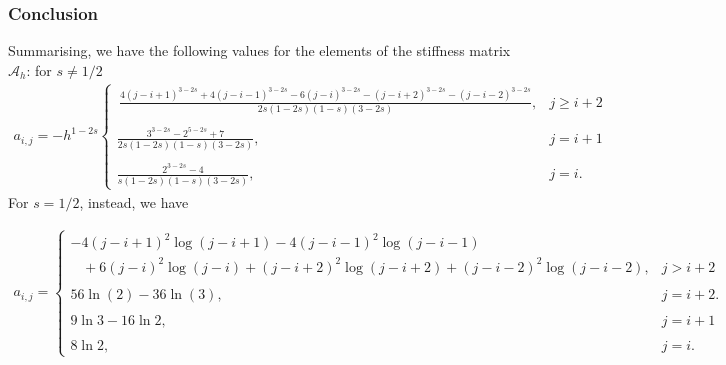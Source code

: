 \subsubsection*{Conclusion}
Summarising, we have the following values for the elements of the stiffness matrix $\mathcal{A}_h$: for $s\neq 1/2$
\begin{align*}
	a_{i,j} =  -h^{1-2s} \begin{cases}
			\displaystyle \,\frac{4(j-i+1)^{3-2s} + 4(j-i-1)^{3-2s}-6(j-i)^{3-2s}-(j-i+2)^{3-2s}-(j-i-2)^{3-2s}}{2s(1-2s)(1-s)(3-2s)}, &  \displaystyle j\geq i+2
			\\
			\\
			\displaystyle\frac{3^{3-2s}-2^{5-2s}+7}{2s(1-2s)(1-s)(3-2s)}, & \displaystyle j=i+1
			\\
			\\
			\displaystyle\frac{2^{3-2s}-4}{s(1-2s)(1-s)(3-2s)}, & \displaystyle j=i.
		\end{cases}	
\end{align*}
For $s=1/2$, instead, we have

\begin{align*}
	a_{i,j} = \begin{cases}
			-4(j-i+1)^2\log(j-i+1)-4(j-i-1)^2\log(j-i-1) 
			\\
			\;\;\;+6(j-i)^2\log(j-i)+(j-i+2)^2\log(j-i+2)+(j-i-2)^2\log(j-i-2), &  \displaystyle j> i+2
			\\
			\\
			56\ln(2)-36\ln(3), & \displaystyle j= i+2.
			\\
			\\
			\displaystyle 9\ln 3-16\ln 2, & \displaystyle j=i+1
			\\
			\\
			\displaystyle 8\ln 2, & \displaystyle j=i.
		\end{cases}	
\end{align*}





